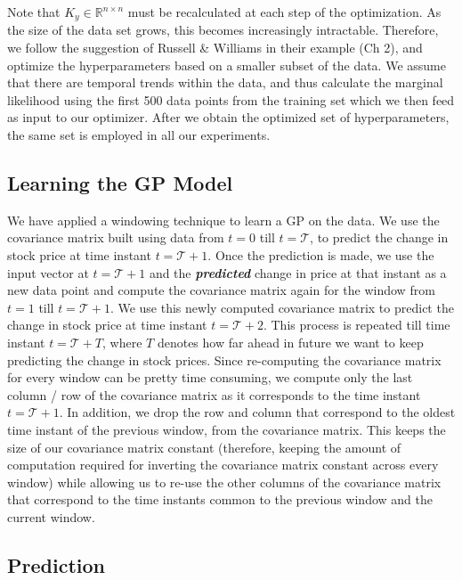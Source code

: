 \documentclass{article} %
\def\R{\mathbb R}
\begin{document}
Note that $K_y \in \R^{n \times n}$ must be recalculated at each step of the optimization.
As the size of the data set grows, this becomes increasingly intractable.
Therefore, we follow the suggestion of Russell \& Williams in their example (Ch 2), and optimize the hyperparameters based on a smaller subset of the data. We assume that there are temporal trends within the data, and thus calculate the marginal likelihood using the first 500 data points from the training set which we then feed as input to our optimizer. After we obtain the optimized set of hyperparameters, the same set is employed in all our experiments.


\subsection{Learning the GP Model}

We have applied a windowing technique to learn a GP on the data. We use the covariance matrix built using data from $t = 0$ till $t = \mathcal{T}$, to predict the change in stock price at time instant $t = \mathcal{T}+1$. Once the prediction is made, we use the input vector at $t = \mathcal{T}+1$ and the \textbf{\textit{predicted}} change in price at that instant as a new data point and compute the covariance matrix again for the window from $t = 1$ till $t = \mathcal{T}+1$. We use this newly computed covariance matrix to predict the change in stock price at time instant $t=\mathcal{T}+2$. This process is repeated till time instant $t = \mathcal{T}+T$, where $T$ denotes how far ahead in future we want to keep predicting the change in stock prices. Since re-computing the covariance matrix for every window can be pretty time consuming, we compute only the last column / row of the covariance matrix as it corresponds to the time instant $t = \mathcal{T}+1$. In addition, we drop the row and column that correspond to the oldest time instant of the previous window, from the covariance matrix. This keeps the size of our covariance matrix constant (therefore, keeping the amount of computation required for inverting the covariance matrix constant across every window) while allowing us to re-use the other columns of the covariance matrix that correspond to the time instants common to the previous window and the current window.

\subsection{Prediction}
\end{document}
